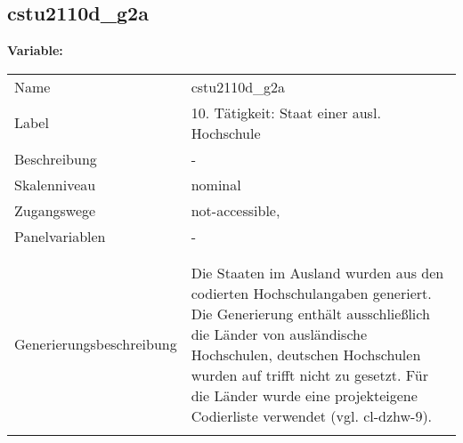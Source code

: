 	
	
	\subsection{cstu2110d\_g2a}
	\label{subSection:cstu2110d_g2a}

	\noindent\textbf{Variable:}\\
		\begin{tabular}{lL{11.3cm}}
			\label{tableVariable:cstu2110d_g2a}
			Name & cstu2110d\_g2a \\
			Label & 10. Tätigkeit: Staat einer ausl. Hochschule \\
			Beschreibung & - \\
			Skalenniveau & nominal \\
			Zugangswege &
				not-accessible,
 \\
			Panelvariablen & -
			 \\
			 \\
 \\
					Generierungsbeschreibung & Die Staaten im Ausland wurden aus den codierten Hochschulangaben generiert. Die Generierung enthält ausschließlich die Länder von ausländische Hochschulen, deutschen Hochschulen wurden auf trifft nicht zu gesetzt. Für die Länder wurde eine projekteigene Codierliste verwendet (vgl. cl-dzhw-9).
				 \\	
			 \\
		\end{tabular}






	
	\newpage
